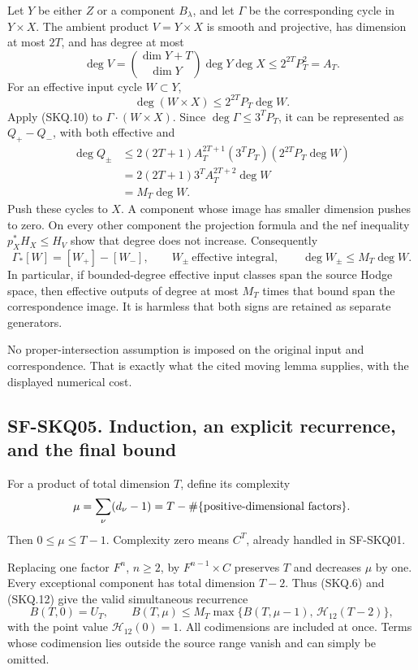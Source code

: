 Let \(Y\) be either \(Z\) or a component \(B_\lambda\), and let
\(\Gamma\) be the corresponding cycle in \(Y\times X\). The ambient
product \(V=Y\times X\) is smooth and projective, has dimension at most
\(2T\), and has degree at most \[
 \deg V
 =\binom{\dim Y+T}{\dim Y}\deg Y\deg X
 \le2^{2T}P_T^2=A_T.
\] For an effective input cycle \(W\subset Y\), \[
 \deg(W\times X)\le2^{2T}P_T\deg W.
\] Apply (SKQ.10) to \(\Gamma\cdot(W\times X)\). Since
\(\deg\Gamma\le3^TP_T\), it can be represented as \(Q_+-Q_-\), with both
effective and \[
 \begin{aligned}
 \deg Q_\pm
 &\le
 2(2T+1)A_T^{2T+1}
      (3^TP_T)(2^{2T}P_T\deg W)\\
 &=2(2T+1)3^TA_T^{2T+2}\deg W\\
 &=M_T\deg W.
 \end{aligned}
 \tag{SKQ.11}
\] Push these cycles to \(X\). A component whose image has smaller
dimension pushes to zero. On every other component the projection
formula and the nef inequality \(p_X^*H_X\le H_V\) show that degree does
not increase. Consequently \[
 \Gamma_*[W]=[W_+]-[W_-],\qquad
 W_\pm\ \text{effective integral},\qquad
 \deg W_\pm\le M_T\deg W.
 \tag{SKQ.12}
\] In particular, if bounded-degree effective input classes span the
source Hodge space, then effective outputs of degree at most \(M_T\)
times that bound span the correspondence image. It is harmless that both
signs are retained as separate generators.

No proper-intersection assumption is imposed on the original input and
correspondence. That is exactly what the cited moving lemma supplies,
with the displayed numerical cost.

\subsection{SF-SKQ05. Induction, an explicit recurrence, and the final
bound}\label{SF-SKQ05}

For a product of total dimension \(T\), define its complexity \[
 \mu=\sum_\nu(d_\nu-1)=T-\#\{\hbox{positive-dimensional factors}\}.
\] Then \(0\le\mu\le T-1\). Complexity zero means \(C^T\), already
handled in SF-SKQ01.

Replacing one factor \(F^n\), \(n\ge2\), by \(F^{n-1}\times C\)
preserves \(T\) and decreases \(\mu\) by one. Every exceptional
component has total dimension \(T-2\). Thus (SKQ.6) and (SKQ.12) give
the valid simultaneous recurrence \[
 B(T,0)=U_T,\qquad
 B(T,\mu)\le
 M_T\max\{B(T,\mu-1),\,\mathcal H_{12}(T-2)\},
 \tag{SKQ.13}
\] with the point value \(\mathcal H_{12}(0)=1\). All codimensions are
included at once. Terms whose codimension lies outside the source range
vanish and can simply be omitted.

